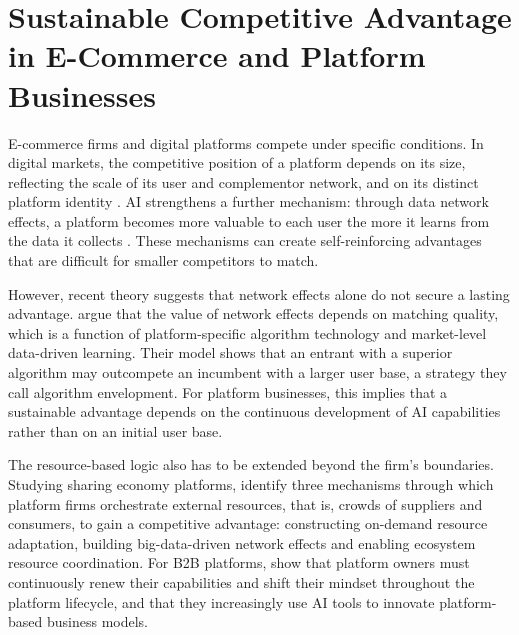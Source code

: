\section{Sustainable Competitive Advantage in E-Commerce and Platform Businesses}
\label{sec:sca}

E-commerce firms and digital platforms compete under specific conditions. In digital markets, the competitive position of a platform depends on its size, reflecting the scale of its user and complementor network, and on its distinct platform identity \parencite[265]{cennamo2021}. AI strengthens a further mechanism: through data network effects, a platform becomes more valuable to each user the more it learns from the data it collects \parencite[534]{gregory2021}. These mechanisms can create self-reinforcing advantages that are difficult for smaller competitors to match.

However, recent theory suggests that network effects alone do not secure a lasting advantage. \textcite[187]{chen2026} argue that the value of network effects depends on matching quality, which is a function of platform-specific algorithm technology and market-level data-driven learning. Their model shows that an entrant with a superior algorithm may outcompete an incumbent with a larger user base, a strategy they call algorithm envelopment. For platform businesses, this implies that a sustainable advantage depends on the continuous development of AI capabilities rather than on an initial user base.

The resource-based logic also has to be extended beyond the firm's boundaries. Studying sharing economy platforms, \textcite[451]{zeng2021} identify three mechanisms through which platform firms orchestrate external resources, that is, crowds of suppliers and consumers, to gain a competitive advantage: constructing on-demand resource adaptation, building big-data-driven network effects and enabling ecosystem resource coordination. For B2B platforms, \textcite[1]{hautamaki2025} show that platform owners must continuously renew their capabilities and shift their mindset throughout the platform lifecycle, and that they increasingly use AI tools to innovate platform-based business models.

